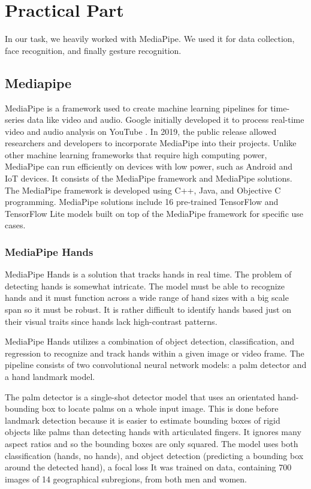 \chapter{Practical Part}
In our task, we heavily worked with MediaPipe. We used it for data collection, face recognition, and finally gesture recognition. 

\section{Mediapipe}
MediaPipe is a framework used to create machine learning pipelines for time-series data like video and audio. Google initially developed it to process real-time video and audio analysis on YouTube \cite{mediapipe2019blog}. In 2019, the public release allowed researchers and developers to incorporate MediaPipe into their projects. Unlike other machine learning frameworks that require high computing power, MediaPipe can run efficiently on devices with low power, such as Android and IoT devices. It consists of the MediaPipe framework and MediaPipe solutions. The MediaPipe framework is developed using C++, Java, and Objective C programming. MediaPipe solutions include 16 pre-trained TensorFlow and TensorFlow Lite models built on top of the MediaPipe framework for specific use cases.
\subsection*{MediaPipe Hands}
MediaPipe Hands is a solution that tracks hands in real time. The problem of detecting hands is somewhat intricate. The model must be able to recognize hands and it must function across a wide range of hand sizes with a big scale span so it must be robust. It is rather difficult to identify hands based just on their visual traits since hands lack high-contrast patterns.%

MediaPipe Hands utilizes a combination of object detection, classification, and regression to recognize and track hands within a given image or video frame. The pipeline consists of two convolutional neural network models: a palm detector and a hand landmark model.


The palm detector is a single-shot detector model that uses an orientated hand-bounding box to locate palms on a whole input image. This is done before landmark detection because it is easier to estimate bounding boxes of rigid objects like palms than detecting hands with articulated fingers. It ignores many aspect ratios and so the bounding boxes are only squared. The model uses both classification (hands, no hands), and object detection (predicting a bounding box around the detected hand), a focal loss \cite{DBLP:journals/corr/abs-1708-02002} It was trained on data, containing 700 images of 14 geographical subregions, from both men and women.


